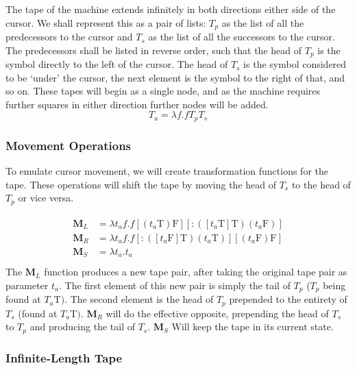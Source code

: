 \documentclass[Master.tex]{subfiles}
\begin{document}
The tape of the machine extends infinitely in both directions either side of the cursor. We shall represent this as a pair of lists: $T_p$ as the list of all the predecessors to the cursor and $T_s$ as the list of all the successors to the cursor. The predecessors shall be listed in reverse order, such that the head of $T_p$ is the symbol directly to the left of the cursor. The head of $T_s$ is the symbol considered to be `under' the cursor, the next element is the symbol to the right of that, and so on. These tapes will begin as a single node, and as the machine requires further squares in either direction further nodes will be added.
\begin{equation*}
T_a = \lambda f.f T_p T_s
\end{equation*}

\subsubsection{Movement Operations}
To emulate cursor movement, we will create transformation functions for the tape. These operations will shift the tape by moving the head of $T_s$ to the head of $T_p$ or vice versa.

\begin{gather*}
\begin{aligned}
\bm{M}_L &= \lambda t_a f.f [(t_a\bm{\mathrm{T}})\bm{\mathrm{F}}] [\bm{\mathrm{:}}([t_a\bm{\mathrm{T}}]\bm{\mathrm{T}})(t_a\bm{\mathrm{F}})]\\
\bm{M}_R &= \lambda t_a f.f [\bm{\mathrm{:}}([t_a\bm{\mathrm{F}}]\bm{\mathrm{T}})(t_a\bm{\mathrm{T}})] [(t_a\bm{\mathrm{F}})\bm{\mathrm{F}}]\\
\bm{M}_S &= \lambda t_a.t_a\\
\end{aligned}
\end{gather*}
The $\bm{M}_L$ function produces a new tape pair, after taking the original tape pair as parameter $t_a$. The first element of this new pair is simply the tail of $T_p$ ($T_p$ being found at $T_a\bm{\mathrm{T}})$. The second element is the head of $T_p$ prepended to the entirety of $T_s$ (found at $T_a\bm{\mathrm{T}})$. $\bm{M}_R$ will do the effective opposite, prepending the head of $T_s$ to $T_p$ and producing the tail of $T_s$. $\bm{M}_S$ Will keep the tape in its current state.

\subsubsection{Infinite-Length Tape}
\end{document}
